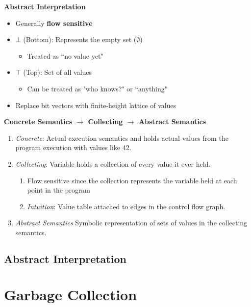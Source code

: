 \documentclass[10pt,twocolumn]{report}
\begin{document}
\textbf{Abstract Interpretation}
\begin{itemize}
  \item Generally \textbf{flow sensitive}
  \item $\bot$ (Bottom): Represents the empty set ($\emptyset$)
  \begin{itemize}
    \item Treated as ``no value yet"
  \end{itemize}
  \item $\top$ (Top): Set of all values
  \begin{itemize}
    \item Can be treated as "who knows?" or ``anything"
  \end{itemize}
  \item Replace bit vectors with finite-height lattice of values
\end{itemize}

\textbf{Concrete Semantics $\rightarrow$ Collecting $\rightarrow$ Abstract Semantics}
\begin{enumerate}
  \item \textit{Concrete}: Actual execution semantics and holds actual values from the program execution with values like 42.
  \item \textit{Collecting}: Variable holds a collection of every value it ever held.
  \begin{enumerate}
    \item Flow sensitive since the collection represents the variable held at each point in the program
    \item \emph{Intuition}: Value table attached to edges in the control flow graph.
  \end{enumerate}
  \item \emph{Abstract Semantics} Symbolic representation of sets of values in the collecting semantics.
\end{enumerate}

\subsection{Abstract Interpretation}


\section{Garbage Collection}
\end{document}
